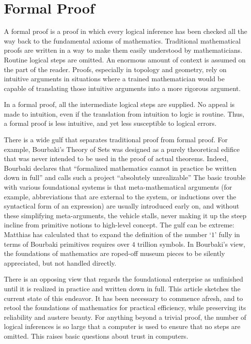 \documentclass{llncs}
\begin{document}
\section{Formal Proof}

A formal proof is a proof in which every logical inference has
been checked all the way back to the fundamental axioms of mathematics.
Traditional mathematical proofs are written in a way to make them easily understood by mathematicians. Routine logical steps are omitted. An enormous amount of context is assumed on the part of the reader. Proofs, especially in topology and geometry, rely on intuitive arguments in situations where a trained mathematician would be capable of translating those intuitive arguments into a more rigorous argument.

In a formal proof, all the intermediate logical steps are supplied. No appeal is made to intuition, even if the translation from intuition to logic is routine. Thus, a formal proof is less intuitive, and yet less susceptible to logical errors.

There is a wide gulf that separates traditional proof from formal proof.
For example, Bourbaki's Theory of Sets was designed as a purely theoretical
edifice that was never intended to be used in the proof of actual theorems.
Indeed, Bourbaki declares that ``formalized mathematics cannot
in practice be written down in full'' and calls such a project
``absolutely unrealizable''  %
The basic trouble with various foundational systems is that meta-mathematical arguments (for
example, abbreviations that are external to the system, or
inductions over the syntactical form of an expression) 
are usually introduced early on, and without these simplifying meta-arguments,
the vehicle stalls, never making it up the steep incline from primitive notions to 
high-level concept.   The gulf can be extreme: Matthias has calculated
that to expand the definition of the number `$1$' fully in terms of Bourbaki primitives requires
over $4$ trillion symbols.
In Bourbaki's view, 
the foundations of mathematics are roped-off museum pieces
to be silently appreciated, 
but not handled directly.

There is an opposing view that regards the 
foundational enterprise
as unfinished until it is realized in practice and written down in full.
This article sketches the current state of this endeavor.
It has been necessary to commence afresh, and to retool the foundations
of mathematics for practical efficiency, while preserving
its reliability and austere beauty.  For anything beyond a trivial
proof, the number of logical inferences is so large that a computer is
used to ensure that no steps are omitted.   This raises basic questions
about trust in computers.
\end{document}
